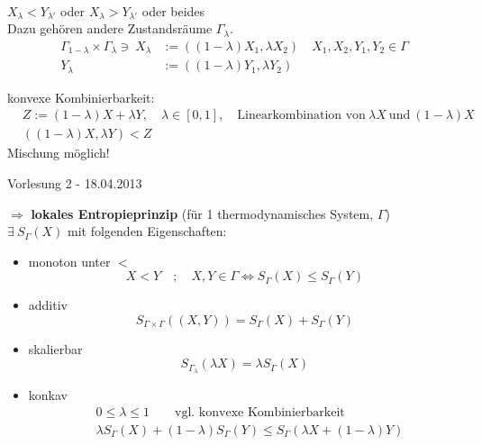\documentclass[10pt,article,colorback,accentcolor=tud9d]{scrartcl}
\begin{document}
\begin{itemize}
\begin{fleqn}
\begin{equation}
\begin{aligned}
\end{aligned}
\end{equation}
${X}_\lambda < {Y}_{\lambda'}$ oder ${X}_\lambda > {Y}_{\lambda'}$ oder beides\\
Dazu gehören andere Zustandsräume $\Gamma_\lambda$.\\
\begin{equation}
\begin{aligned}
\Gamma_{1-\lambda} \times \Gamma_\lambda \ni \ X_\lambda &:=((1-\lambda)X_1,\lambda X_2) \quad X_1,X_2,Y_1,Y_{2} \in \Gamma\\
Y_\lambda &:=((1-\lambda)Y_1,\lambda Y_2)
\end{aligned}
\end{equation}

\item konvexe Kombinierbarkeit:\\
\begin{equation}
\begin{aligned}
&Z:=(1-\lambda)X +\lambda Y, \quad \lambda \in [0,1], \quad \text{Linearkombination von} \ \lambda X \ \text{und} \ (1-\lambda)X\\
&((1-\lambda)X,\lambda Y)<Z
\end{aligned}
\end{equation}
Mischung möglich!
\end{fleqn}
\end{itemize}
\begin{flushright}Vorlesung 2 - 18.04.2013\end{flushright}
$\Rightarrow$ \textbf{lokales Entropieprinzip} (für 1 thermodynamisches System, $\Gamma$)\\
$\exists \ S_\Gamma(X)$ mit folgenden Eigenschaften: 
\begin{fleqn}
\begin{itemize}
\item monoton unter $<$
\begin{equation}
X<Y \quad ; \quad X,Y \in \Gamma \Leftrightarrow S_\Gamma(X) \leq S_\Gamma(Y)
\end{equation}
\item additiv
\begin{equation}
S_{\Gamma \times \Gamma}((X,Y))=S_\Gamma(X)+S_\Gamma(Y)
\end{equation}
\item skalierbar 
\begin{equation}
S_{\Gamma_\lambda}(\lambda X)=\lambda S_\Gamma(X)
\end{equation}
\item konkav
\begin{equation}
\begin{aligned}
&0 \leq \lambda \leq 1 \quad \quad \text{vgl. konvexe Kombinierbarkeit}\\
&\lambda S_\Gamma(X)+(1-\lambda)S_\Gamma(Y) \leq S_\Gamma(\lambda X +(1-\lambda)Y)
\end{aligned}
\end{equation}
\end{itemize}
\end{fleqn}
\end{document}
